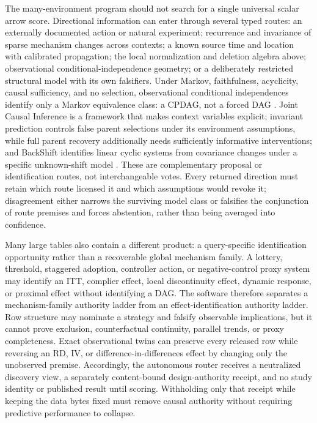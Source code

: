 \documentclass[11pt]{article}
\begin{document}
The many-environment program should not search for a single universal scalar
arrow score.  Directional information can enter through several typed routes:
an externally documented action or natural experiment; recurrence and
invariance of sparse mechanism changes across contexts; a known source time and
location with calibrated propagation; the local normalization and deletion
algebra above; observational conditional-independence geometry; or a deliberately
restricted structural model with its own falsifiers.  Under Markov,
faithfulness, acyclicity, causal sufficiency, and no selection, observational
conditional independences identify only a Markov equivalence class: a CPDAG,
not a forced DAG \citep{spirtes2000causation,meek1995causal}.  Joint Causal
Inference is a framework that makes context variables explicit; invariant
prediction controls false parent selections under its environment assumptions,
while full parent recovery additionally needs sufficiently informative
interventions; and BackShift identifies linear cyclic systems from
covariance changes under a specific unknown-shift model
\citep{mooij2020jci,peters2016icp,rothenhausler2015backshift}.  These are
complementary proposal or identification routes, not interchangeable votes.
Every returned direction must retain which route licensed it and which
assumptions would revoke it; disagreement either narrows the surviving model
class or falsifies the conjunction of route premises and forces abstention,
rather than being averaged into confidence.

Many large tables also contain a different product: a query-specific
identification opportunity rather than a recoverable global mechanism family.
A lottery, threshold, staggered adoption, controller action, or negative-control
proxy system may identify an ITT, complier effect, local discontinuity effect,
dynamic response, or proximal effect without identifying a DAG.  The software
therefore separates a mechanism-family authority ladder from an
effect-identification authority ladder.  Row structure may nominate a strategy
and falsify observable implications, but it cannot prove exclusion,
counterfactual continuity, parallel trends, or proxy completeness.  Exact
observational twins can preserve every released row while reversing an RD, IV,
or difference-in-differences effect by changing only the unobserved premise.
Accordingly, the autonomous router receives a neutralized discovery view, a
separately content-bound design-authority receipt, and no study identity or
published result until scoring.  Withholding only that receipt while keeping
the data bytes fixed must remove causal authority without requiring predictive
performance to collapse.
\end{document}
